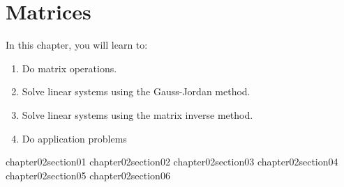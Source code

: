 \chapter{Matrices}\label{chapter_matrices}

In this chapter, you will learn to:

\begin{enumerate}
    \item Do matrix operations.
    \item Solve linear systems using the Gauss-Jordan method.
    \item Solve linear systems using the matrix inverse method.
    \item Do application problems
\end{enumerate}


{chapter02section01}
{chapter02section02}
{chapter02section03}
{chapter02section04}
{chapter02section05}
{chapter02section06}